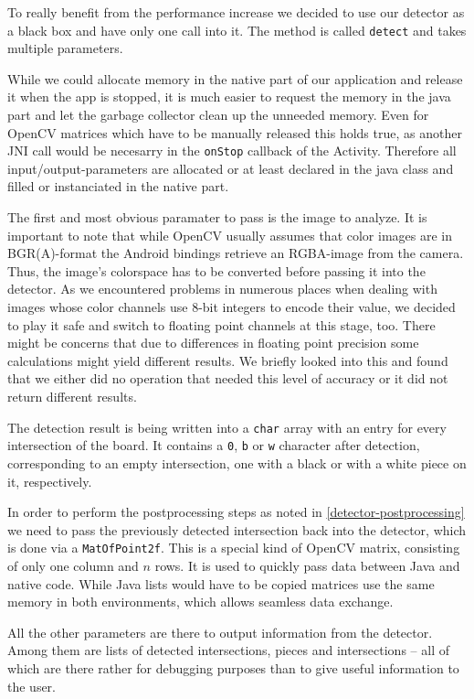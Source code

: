 	To really benefit from the performance increase we decided to use our detector as a black box and have only one call into it. The method is called \texttt{detect} and takes multiple parameters.

	While we could allocate memory in the native part of our application and release it when the app is stopped, it is much easier to request the memory in the java part and let the garbage collector clean up the unneeded memory. Even for OpenCV matrices which have to be manually released this holds true, as another JNI call would be necesarry in the \texttt{onStop} callback of the Activity. Therefore all input/output-parameters are allocated or at least declared in the java class and filled or instanciated in the native part.

	The first and most obvious paramater to pass is the image to analyze. It is important to note that while OpenCV usually assumes that color images are in BGR(A)-format the Android bindings retrieve an RGBA-image from the camera. Thus, the image's colorspace has to be converted before passing it into the detector. As we encountered problems in numerous places when dealing with images whose color channels use 8-bit integers to encode their value, we decided to play it safe and switch to floating point channels at this stage, too. There might be concerns that due to differences in floating point precision some calculations might yield different results. We briefly looked into this and found that we either did no operation that needed this level of accuracy or it did not return different results.

	The detection result is being written into a \texttt{char} array with an entry for every intersection of the board. It contains a \texttt{0}, \texttt{b} or \texttt{w} character after detection, corresponding to an empty intersection, one with a black or with a white piece on it, respectively.

	In order to perform the postprocessing steps as noted in \ref{detector-postprocessing} we need to pass the previously detected intersection back into the detector, which is done via a \texttt{MatOfPoint2f}. This is a special kind of OpenCV matrix, consisting of only one column and $n$ rows. It is used to quickly pass data between Java and native code. While Java lists would have to be copied matrices use the same memory in both environments, which allows seamless data exchange.

	All the other parameters are there to output information from the detector. Among them are lists of detected intersections, pieces and intersections -- all of which are there rather for debugging purposes than to give useful information to the user.

